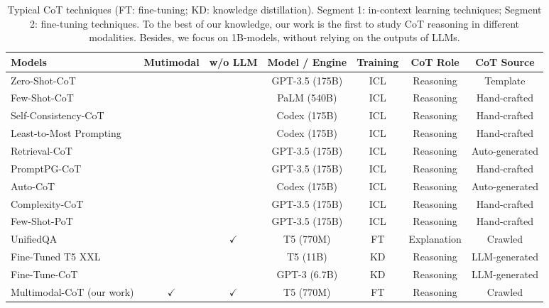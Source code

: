 \documentclass[nohyperref]{article}
\newcommand{\okmark}{{\textbf{\textcolor[rgb]{0.1, 0.5, 0.1}{$\checkmark$}}}}
\newcommand{\ngmark}{{\textbf{\color{red}{\ding{55}}}}}
\theoremstyle{plain}
\theoremstyle{definition}
\theoremstyle{remark}
\begin{document}
\begin{table*}[htb]
\centering
\vspace{-3mm}
\renewcommand\tabcolsep{4.2pt} \small
\caption{Typical CoT techniques (FT: fine-tuning; KD: knowledge distillation). Segment 1: in-context learning techniques; Segment 2: fine-tuning techniques. To the best of our knowledge, our work is the first to study CoT reasoning in different modalities. Besides, we focus on 1B-models, without relying on the outputs of LLMs. \label{tab:cot_methods}
}
\begin{tabular}{lcccccc} 
\toprule
\textbf{Models} & \textbf{Mutimodal} & \textbf{w/o LLM}  & \textbf{Model / Engine}  & \textbf{Training}  & \textbf{CoT Role} & \textbf{CoT Source} \\ 
\midrule
Zero-Shot-CoT~\citep{kojima2022large} & \ngmark & \ngmark & GPT-3.5 (175B)  & ICL  & Reasoning & Template  \\
Few-Shot-CoT~\citep{cot_wei} & \ngmark & \ngmark   & PaLM (540B) & ICL & Reasoning & Hand-crafted \\
Self-Consistency-CoT~\citep{cot_wei_sc} & \ngmark & \ngmark & Codex  (175B) & ICL  & Reasoning& Hand-crafted   \\
Least-to-Most Prompting~\citep{zhou2022least}& \ngmark& \ngmark  & Codex (175B)  & ICL & Reasoning & Hand-crafted   \\
Retrieval-CoT~\citep{zhang2022automatic} & \ngmark& \ngmark  & GPT-3.5 (175B) & ICL  & Reasoning & Auto-generated  \\
PromptPG-CoT~\citep{lu2022dynamic} & \ngmark & \ngmark & GPT-3.5 (175B) & ICL & Reasoning  & Hand-crafted   \\
Auto-CoT~\citep{zhang2022automatic} & \ngmark & \ngmark  & Codex (175B)  & ICL & Reasoning  & Auto-generated \\
Complexity-CoT~\citep{fu2022complexity}& \ngmark & \ngmark  & GPT-3.5 (175B) & ICL  & Reasoning & Hand-crafted  \\
Few-Shot-PoT~\citep{chen2022program} & \ngmark & \ngmark & GPT-3.5 (175B) & ICL & Reasoning  & Hand-crafted  \\ 
\midrule
UnifiedQA~\citep{lu2022learn}& \ngmark  & \okmark   & T5 (770M)& FT & Explanation  & Crawled\\
Fine-Tuned T5 XXL~\citep{magister2022teaching}  & \ngmark & \ngmark  & T5 (11B)& KD & Reasoning  & LLM-generated \\
Fine-Tune-CoT \citep{ho2022large} & \ngmark & \ngmark  & GPT-3 (6.7B) & KD & Reasoning  & LLM-generated \\
Multimodal-CoT (our work) & \okmark &\okmark  & T5 (770M)& FT & Reasoning  & Crawled   \\ 
\bottomrule
\end{tabular}
\vspace{-5mm}
\end{table*}
\end{document}
